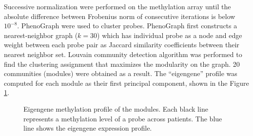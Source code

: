 \documentclass{article}
\begin{document}
Successive normalization were performed on the methylation array \cite{olshen2010successive} until the absolute difference between Frobenius norm of consecutive iterations is below $10^{-8}$. PhenoGraph  \cite{levine2015data} were used to cluster probes. PhenoGraph first constructs a nearest-neighbor graph ($k = 30$) which has individual probe as a node and edge weight between each probe pair as Jaccard similarity coefficients between their nearest neighbor set. Louvain community detection algorithm was performed to find the clustering assignment that maximizes the modularity on the graph. 20 communities (modules) were obtained as a result. The ``eigengene'' profile was computed for each module as their first principal component, shown in the Figure \ref{eigenGene}. 

\begin{figure}[htbp]
\begin{center}

\caption[Eigengene methylation profile of the modules]{Eigengene methylation profile of the modules. Each black line represents a methylation level of a probe across patients. The blue line shows the eigengene expression profile.}
\label{eigenGene}
\end{center}
\end{figure}



\clearpage

\appendix

\clearpage
\end{document}
